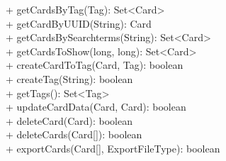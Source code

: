 { 
    + getCardsByTag(Tag): Set<Card> \\
    + getCardByUUID(String): Card \\
    + getCardsBySearchterms(String): Set<Card> \\
    + getCardsToShow(long, long): Set<Card> \\
    + createCardToTag(Card, Tag): boolean \\
    + createTag(String): boolean \\
    + getTags(): Set<Tag> \\
    + updateCardData(Card, Card): boolean \\
    + deleteCard(Card): boolean \\
    + deleteCards(Card[]): boolean \\
    + exportCards(Card[], ExportFileType): boolean \\
}{}